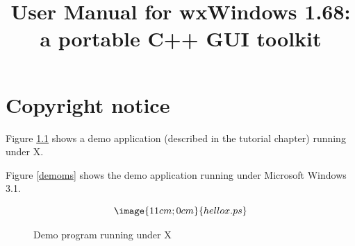 %
%
%
%
%
%
%
%
\newcommand{\indexit}[1]{#1\index{#1}}%
\newcommand{\pipe}[0]{$\|$\ }%

\parskip=10pt
\parindent=0pt
\title{User Manual for wxWindows 1.68: a portable C++ GUI toolkit}
\makeindex

\maketitle
\pagestyle{fancyplain}

\setfooter{\thepage}{}{}{}{}{\thepage}%
\tableofcontents

\chapter{Copyright notice}
%
\setfooter{\thepage}{}{}{}{}{\thepage}%

Figure \ref{demox} shows a demo application (described in the tutorial chapter)
running under X.

Figure \ref{demoms} shows the demo application running under Microsoft Windows 3.1.

\begin{figure}
$$\image{11cm;0cm}{hellox.ps}$$
\caption{Demo program running under X}\label{demox}
\end{figure}



